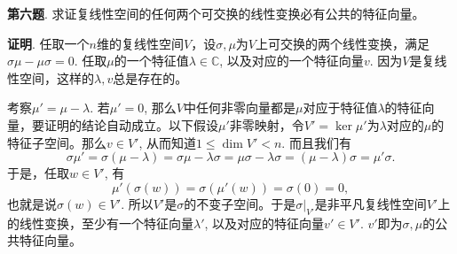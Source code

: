 {\bf 第六题}. 求证复线性空间的任何两个可交换的线性变换必有公共的特征向量。

{\bf 证明}. 任取一个$n$维的复线性空间$V$，设$\sigma, \mu$为$V$上可交换的两个线性变换，满足$\sigma\mu - \mu\sigma = 0$. 任取$\mu$的一个特征值$\lambda \in \mathbb{C}$, 以及对应的一个特征向量$v$. 因为$V$是复线性空间，这样的$\lambda, v$总是存在的。

考察$\mu' = \mu - \lambda$. 若$\mu' = 0$, 那么$V$中任何非零向量都是$\mu$对应于特征值$\lambda$的特征向量，要证明的结论自动成立。以下假设$\mu'$非零映射，令$V' = \ker\mu'$为$\lambda$对应的$\mu$的特征子空间。那么$v\in V'$, 从而知道$1 \leqslant \dim V' < n$. 而且我们有
$$\sigma\mu' = \sigma(\mu-\lambda) = \sigma\mu - \lambda\sigma = 
\mu\sigma - \lambda\sigma = (\mu-\lambda)\sigma = \mu'\sigma.$$
于是，任取$w\in V'$, 有
$$\mu'(\sigma(w)) = \sigma(\mu'(w)) = \sigma(0) = 0,$$
也就是说$\sigma(w) \in V'$. 所以$V'$是$\sigma$的不变子空间。于是$\sigma|_{V'}$是非平凡复线性空间$V'$上的线性变换，至少有一个特征向量$\lambda'$, 以及对应的特征向量$v'\in V'$. $v'$即为$\sigma, \mu$的公共特征向量。



